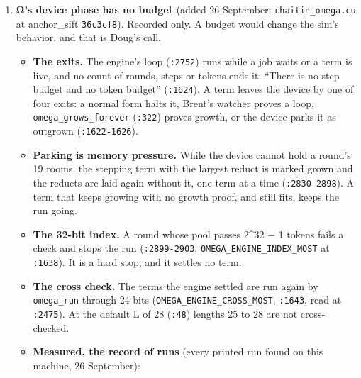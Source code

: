 \begin{enumerate}
\begin{itemize}
\begin{itemize}
\item \textbf{The name, a reading.} Doug chooses the name, a Latin one (Telos, τέλος, “end” or “purpose”, is Greek). The rename waits on this working and lands as one change at a clean point. Nothing is renamed now. The conclusion in the second quote is Doug's expectation, and no figure in the tree bears on it.
\end{itemize}
\end{itemize}
\item \textbf{Ω's device phase has no budget} (added 26 September; \texttt{chaitin\_\allowbreak{}omega.\allowbreak{}cu} at anchor\_\allowbreak{}sift \texttt{36c3cf8}). Recorded only. A budget would change the sim's behavior, and that is Doug's call.

\begin{itemize}
\item \textbf{The exits.} The engine's loop (\texttt{:2752}) runs while a job waits or a term is live, and no count of rounds, steps or tokens ends it: “There is no step budget and no token budget” (\texttt{:1624}). A term leaves the device by one of four exits: a normal form halts it, Brent's watcher proves a loop, \texttt{omega\_\allowbreak{}grows\_\allowbreak{}forever} (\texttt{:322}) proves growth, or the device parks it as outgrown (\texttt{:1622-1626}).
\item \textbf{Parking is memory pressure.} While the device cannot hold a round's 19 rooms, the stepping term with the largest reduct is marked grown and the reducts are laid again without it, one term at a time (\texttt{:2830-2898}). A term that keeps growing with no growth proof, and still fits, keeps the run going.
\item \textbf{The 32-bit index.} A round whose pool passes 2\textasciicircum{}32 − 1 tokens fails a check and stops the run (\texttt{:2899-2903}, \texttt{OMEGA\_\allowbreak{}ENGINE\_\allowbreak{}INDEX\_\allowbreak{}MOST} at \texttt{:1638}). It is a hard stop, and it settles no term.
\item \textbf{The cross check.} The terms the engine settled are run again by \texttt{omega\_\allowbreak{}run} through 24 bits (\texttt{OMEGA\_\allowbreak{}ENGINE\_\allowbreak{}CROSS\_\allowbreak{}MOST}, \texttt{:1643}, read at \texttt{:2475}). At the default L of 28 (\texttt{:48}) lengths 25 to 28 are not cross-checked.
\item \textbf{Measured, the record of runs} (every printed run found on this machine, 26 September):


\end{itemize}
\end{enumerate}
